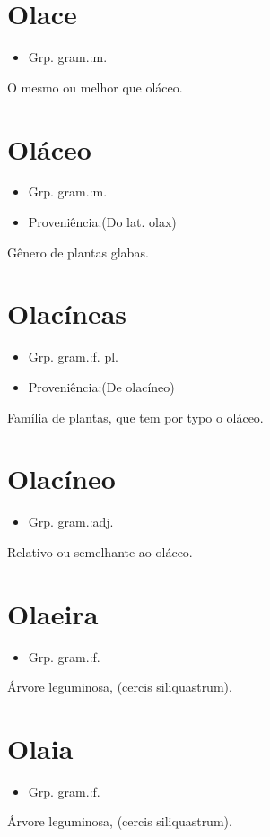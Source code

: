 \section{Olace}
\begin{itemize}
\item {Grp. gram.:m.}
\end{itemize}
O mesmo ou melhor que \textunderscore oláceo\textunderscore .
\section{Oláceo}
\begin{itemize}
\item {Grp. gram.:m.}
\end{itemize}
\begin{itemize}
\item {Proveniência:(Do lat. \textunderscore olax\textunderscore )}
\end{itemize}
Gênero de plantas glabas.
\section{Olacíneas}
\begin{itemize}
\item {Grp. gram.:f. pl.}
\end{itemize}
\begin{itemize}
\item {Proveniência:(De \textunderscore olacíneo\textunderscore )}
\end{itemize}
Família de plantas, que tem por typo o oláceo.
\section{Olacíneo}
\begin{itemize}
\item {Grp. gram.:adj.}
\end{itemize}
Relativo ou semelhante ao oláceo.
\section{Olaeira}
\begin{itemize}
\item {Grp. gram.:f.}
\end{itemize}
Árvore leguminosa, (\textunderscore cercis siliquastrum\textunderscore ).
\section{Olaia}
\begin{itemize}
\item {Grp. gram.:f.}
\end{itemize}
Árvore leguminosa, (\textunderscore cercis siliquastrum\textunderscore ).
